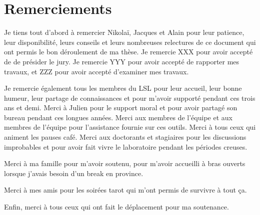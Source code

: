 \documentclass[french]{spimufcphdthesis}
\begin{document}
\chapter*{Remerciements}


Je tiens tout d'abord à remercier Nikola\"i, Jacques et Alain pour leur
patience, leur disponibilité, leurs conseils et leurs nombreuses relectures de
ce document qui ont permis le bon déroulement de ma thèse.
Je remercie XXX pour avoir accepté de de présider le jury.
Je remercie YYY pour avoir accepté de rapporter mes travaux, et ZZZ pour avoir
accepté d'examiner mes travaux.

Je remercie également tous les membres du LSL pour leur accueil, leur bonne
humeur, leur partage de connaissances et pour m'avoir supporté pendant ces trois
ans et demi.
Merci à Julien pour le support moral et pour avoir partagé son bureau
pendant ces longues années.
Merci aux membres de l'équipe \framac et aux membres de l'équipe \pathcrawler
pour l'assistance fournie sur ces outils.
Merci à tous ceux qui animent les pauses café.
Merci aux doctorants et stagiaires pour les discussions improbables et pour
avoir fait vivre le laboratoire pendant les périodes creuses.

Merci à ma famille pour m'avoir soutenu, pour m'avoir accueilli à bras ouverts
lorsque j'avais besoin d'un break en province.

Merci à mes amis pour les soirées tarot qui m'ont permis de survivre à tout ça.

Enfin, merci à tous ceux qui ont fait le déplacement pour ma soutenance.


\tableofcontents
\mainmatter














\end{document}
